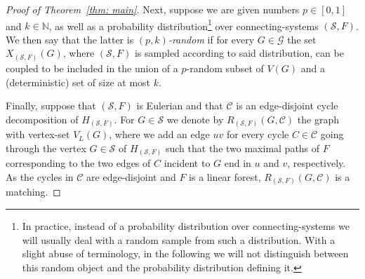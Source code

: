 \documentclass[11pt,reqno]{article}
\begin{document}
\begin{proof}[Proof of Theorem~\ref{thm: main}]
Next, suppose we are given numbers $p\in [0,1]$ and $k\in\mathbb{N}$, as well as a probability distribution\footnote{In practice, instead of a probability distribution over connecting-systems we will usually deal with a random sample from such a distribution. With a slight abuse of terminology, in the following we will not distinguish between this random object and the probability distribution defining it.} over connecting-systems $(\mathcal S,F)$. We then say that the latter is \emph{$(p,k)$-random} if for every $G\in \mathcal{G}$ the set $X_{(\mathcal S,F)}(G)$, where $(\mathcal S,F)$ is sampled according to said distribution, can be coupled to be included in the union of a $p$-random subset of $V(G)$ and a (deterministic) set of size at most $k$. 

Finally, suppose that $(\mathcal S, F)$ is Eulerian and that $\mathcal C$ is an edge-disjoint cycle decomposition of $H_{(\mathcal S,F)}$. For $G\in \mathcal{S}$ we denote by $R_{(\mathcal S,F)}(G,\mathcal C)$ the graph with vertex-set $V_L(G)$, where we add an edge $uv$ for every cycle $C\in\mathcal C$ going through the vertex $G\in \mathcal S$ of $H_{(\mathcal S,F)}$ such that the two maximal paths of $F$ corresponding to the two edges of $C$ incident to $G$ end in $u$ and $v$, respectively. As the cycles in $\mathcal{C}$ are edge-disjoint and $F$ is a linear forest, $R_{(\mathcal S,F)}(G,\mathcal C)$ is a matching.


\end{proof}
\end{document}
